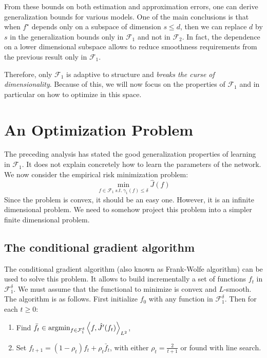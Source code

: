 \documentclass[a4paper, 11pt]{scrartcl}
\begin{document}
{From these bounds on both estimation and approximation errors, one can derive generalization bounds for various models. One of the main conclusions is that when $f^\star$ depends only on a subspace of dimension $s \leq d$, then we can replace $d$ by $s$ in the generalization bounds only in $\mathcal{F}_1$ and not in $\mathcal{F}_2$. In fact, the dependence on a lower dimensional subspace allows to reduce smoothness requirements from the previous result only in $\mathcal{F}_1$.

 Therefore, only $\mathcal{F}_1$ is adaptive to structure and \textit{breaks the curse of dimensionality}. Because of this, we will now focus on the properties of $\mathcal{F}_1$ and in particular on how to optimize in this space.

\section{An Optimization Problem}

The preceding analysis has stated the good generalization properties of learning in $\mathcal{F}_1$. It does not explain concretely how to learn the parameters of the network. We now consider the empirical risk minimization problem:
\begin{equation}
\min_{f\in \mathcal{F}_1~ s.t. ~ \gamma_{1} (f) \leq \delta}  \hat J(f)
\end{equation}
 Since the problem is convex, it should be an easy one. However, it is an infinite dimensional problem. We need to somehow project this problem into a simpler finite dimensional problem.
 
 
\subsection{The conditional gradient algorithm}
 
The conditional gradient algorithm (also known as Frank-Wolfe algorithm) can be used to solve this problem. It allows to build incrementally a set of functions $f_t$ in $\mathcal{F}_1^\delta$. We must assume that the functional to minimize is convex and $L$-smooth.\\

The algorithm is as follows. First initialize $f_0$ with any function in  $\mathcal{F}_1^\delta$. Then for each $t\geq 0$:
\begin{enumerate}
\item Find $\bar f_t \in \textnormal{argmin}_{f \in \mathcal{F}_1^\delta} \left\langle f, \hat J^\prime (f_t) \right\rangle_{L^2}$,
\item Set $f_{t+1} = (1 - \rho_t) f_t + \rho_t \bar f_t$, with either $\rho_t = \frac{2}{t+1}$ or found with line search.
\end{enumerate}

}
\end{document}
